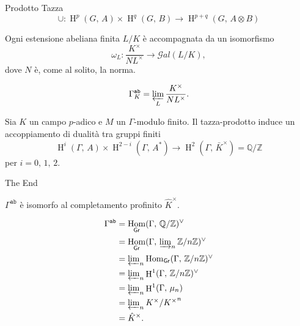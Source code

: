 \documentclass{beamer}
\newcommand{\Z}{\mathbb{Z}}
\newcommand{\Q}{\mathbb{Q}}
\newcommand{\K}{K}
\newcommand{\Gal}[1]{\mathcal{G}al\left( #1 \right)}
\DeclareMathOperator{\Hom}{Hom}
\DeclareMathOperator{\HH}{H}
\begin{document}

\begin{frame}{Prodotto Tazza}
\[ \cup \colon \HH^p(G, \, A) \times \HH^q(G, \, B) \to \HH^{p+q}(G, \, A \otimes B)  \]


\end{frame}

\begin{frame}
\begin{theorem}
Ogni estensione abeliana finita $ L/K $ è accompagnata da un isomorfismo
\[ \omega_L\colon \frac{K^\times}{NL^\times} \to \Gal{L/K}, \]
dove $ N $ è, come al solito, la norma.
\end{theorem}

\begin{equation}\label{lim}
\Gamma_K^{\texttt{ab}} = \varprojlim_L \frac{K^\times}{NL^\times}.
\end{equation}

\end{frame}
\begin{frame}
\begin{theorem}
Sia $ K $ un campo $ p $-adico e $ M $ un $ \Gamma $-modulo finito. Il tazza-prodotto induce un accoppiamento di dualità tra gruppi finiti
\[ \HH^i(\Gamma, \, A) \times \HH^{2-i}(\Gamma, \, A^*) \to \HH^2(\Gamma, \, \bar{K}^\times) = \Q / \Z \]
per $ i = 0, \, 1, \, 2 $.
\end{theorem}

\end{frame}


\begin{frame}{The End}

\begin{theorem}
$ \Gamma^\mathtt{ab} $ è isomorfo al completamento profinito $ \hat{K}^\times $.
\end{theorem}

\begin{align*}
\Gamma^\mathtt{ab}
& = \Hom_\mathsf{Gr}(\Gamma,\, \Q/\Z)^\vee \\[0.1em]
& = \Hom_\mathsf{Gr}(\Gamma,\, \textstyle\varinjlim_n \Z/n\Z)^\vee \\ 
& = \textstyle\varprojlim_n \Hom_\mathsf{Gr}(\Gamma,\, \Z/n\Z)^\vee \\
& = \textstyle\varprojlim_n \HH^1(\Gamma,\, \Z/n\Z)^\vee \\
& = \textstyle\varprojlim_n \HH^1(\Gamma,\, \mu_n) \\
& = \textstyle\varprojlim_n \K^\times / {\K^\times}^n \\
& = \hat{K}^\times.
\end{align*}

\end{frame}
\end{document}
